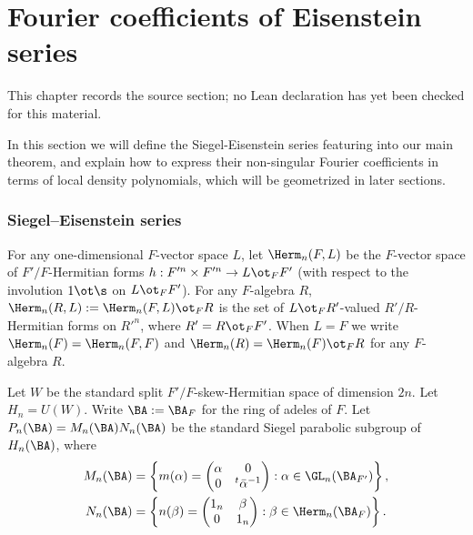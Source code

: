 \chapter{Fourier coefficients of Eisenstein series}
\label{higher-siegel-weil-unitary-nonsingular-terms-chapter-02}

\begin{remark}
\label{higher-siegel-weil-unitary-nonsingular-terms-chapter-02-source}
This chapter records the source section; no Lean declaration has yet been checked for this material.
\notready
\end{remark}

\label{s:Eis}

In this section we will define the Siegel-Eisenstein series featuring into our main theorem, and explain how to express their non-singular Fourier coefficients in terms of local density polynomials, which will be geometrized in later sections.


\subsection{Siegel--Eisenstein series}\label{ss:Eis}
For any one-dimensional $F$-vector space $L$, let $\Herm_{n}(F,L)$ be the $F$-vector space of $F'/F$-Hermitian forms $h: F'^{n}\times F'^{n}\to L\ot_{F}F'$ (with respect to the involution $1\ot\s$ on $L\ot_{F}F'$). For any $F$-algebra $R$, $\Herm_{n}(R, L):=\Herm_{n}(F,L)\ot_{F}R$ is the set of $L\ot_{F}R'$-valued $R'/R$-Hermitian forms on $R'^{n}$, where $R'=R\ot_{F}F'$.  When $L=F$ we write $\Herm_{n}(F)=\Herm_{n}(F,F)$ and $\Herm_{n}(R)=\Herm_{n}(F)\ot_F R$ for any $F$-algebra $R$.

Let $W$ be the standard split $F'/F$-skew-Hermitian space of dimension $2n$.
Let $H_n=U(W)$. Write $\BA := \BA_F$ for the ring of adeles of $F$. Let $P_n(\BA)=M_n(\BA)N_n(\BA)$ be the standard Siegel parabolic subgroup of $H_n(\BA)$, where
\begin{align*}
  M_n(\BA)&=\left\{m(\alpha)=\begin{pmatrix}\alpha & 0\\0 &{}^t\bar \alpha^{-1}\end{pmatrix}: \alpha\in \GL_n(\BA_{F'})\right\},\\
  N_n(\BA) &= \left\{n(\beta)=\begin{pmatrix} 1_n & \beta \\0 & 1_n\end{pmatrix}: \beta\in\Herm_n(\BA_F)\right\}.
\end{align*}

